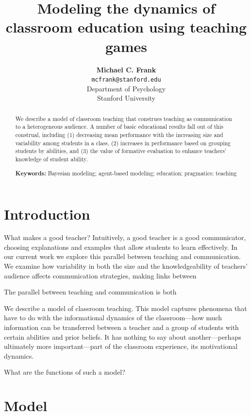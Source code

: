 \documentclass[10pt,letterpaper]{article}
\title{Modeling the dynamics of classroom education using teaching games}
\author{{\large \bf Michael C. Frank} \\
  \texttt{mcfrank@stanford.edu} \\
  Department of Psychology\\
  Stanford University}
\begin{document}
\maketitle

\begin{abstract}
We describe a model of classroom teaching that construes teaching as communication to a heterogeneous audience. A number of basic educational results fall out of this construal, including (1) decreasing mean performance with the increasing size and variability among students in a class, (2) increases in performance based on grouping students by abilities, and (3) the value of formative evaluation to enhance teachers' knowledge of student ability.

\textbf{Keywords:} 
Bayesian modeling; agent-based modeling; education; pragmatics; teaching
\end{abstract}

\section{Introduction}

What makes a good teacher? Intuitively, a good teacher is a good communicator, choosing explanations and examples that allow students to learn effectively. In our current work we explore this parallel between teaching and communication. We examine how variability in both the size and the knowledgeability of teachers' audience affects communication strategies, making links between 

The parallel between teaching and communication is both 
 

\cite{frank2012}

\cite{shafto2008}

\cite{shafto2012}

We describe a model of classroom teaching. This model captures phenomena that have to do with the informational dynamics of the classroom---how much information can be transferred between a teacher and a group of students with certain abilities and prior beliefs. It has nothing to say about another---perhaps ultimately more important---part of the classroom experience, its motivational dynamics.  

What are the functions of such a model? 

\section{Model}
\end{document}

